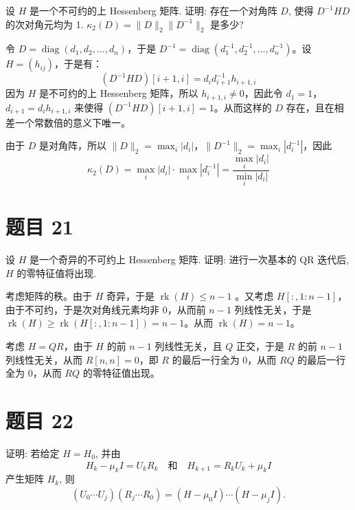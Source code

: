 \documentclass{article}
\newcommand{\diag}{\operatorname{diag}}
\newcommand{\rk}{\operatorname{rk}}
\begin{document}
设 $H$ 是一个不可约的上 Hessenberg 矩阵. 证明: 存在一个对角阵 $D$, 使得 $D^{-1}HD$ 的次对角元均为
1. $\kappa_2(D) = \|D\|_2\|D^{-1}\|_2$ 是多少?

\begin{solution}
  令 $D = \diag(d_1, d_2, \ldots, d_n)$，于是 $D^{-1} = \diag(d_1^{-1},
  d_2^{-1}, \ldots, d_n^{-1})$。设 $H = (h_{ij})$，于是有：
  \[
    (D^{-1}HD)[i+1, i] = d_{i}d_{i+1}^{-1}h_{i+1, i}
  \]
  因为 $H$ 是不可约的上 Hessenberg 矩阵，所以 $h_{i+1, i} \neq 0$，因此令 $d_1 =
  1$，$d_{i+1} = d_i h_{i+1, i}$ 来使得 $(D^{-1}HD)[i+1, i] = 1$。从而这样的
  $D$ 存在，且在相差一个常数倍的意义下唯一。

  由于 $D$ 是对角阵，所以 $\|D\|_2 = \max_i |d_i|$，$\|D^{-1}\|_2 = \max_i
  |d_i^{-1}|$，因此
  \[
    \kappa_2(D) = \max_i |d_i| \cdot \max_i |d_i^{-1}| = \frac{\max_i
    |d_i|}{\min_i |d_i|}
  \]
\end{solution}

\section{题目 21}

设 $H$ 是一个奇异的不可约上 Hessenberg 矩阵. 证明: 进行一次基本的 QR 迭代后, $H$ 的零特征值将出现.

\begin{solution}
  考虑矩阵的秩。由于 $H$ 奇异，于是 $\rk(H) \le n-1$ 。又考虑 $H[:,
  1:n-1]$，由于不可约，于是次对角线元素均非 $0$，从而前 $n-1$ 列线性无关，于是 $\rk(H) \ge
  \rk(H[:, 1:n-1]) = n-1$。从而 $\rk(H) = n-1$。

  考虑 $H = QR$，由于 $H$ 的前 $n-1$ 列线性无关，且 $Q$ 正交，于是 $R$ 的前 $n-1$ 列线性无关，从而
  $R[n,n] = 0$，即 $R$ 的最后一行全为 $0$，从而 $RQ$ 的最后一行全为 $0$，从而 $RQ$ 的零特征值出现。
\end{solution}

\section{题目 22}

证明: 若给定 $H = H_0$, 并由
\[
  H_k - \mu_k I = U_k R_k \quad \text{和} \quad H_{k+1} = R_k U_k + \mu_k I
\]
产生矩阵 $H_k$, 则
\[
  (U_0 \cdots U_j)(R_j \cdots R_0) = (H - \mu_0 I) \cdots (H - \mu_j I).
\]
\end{document}
